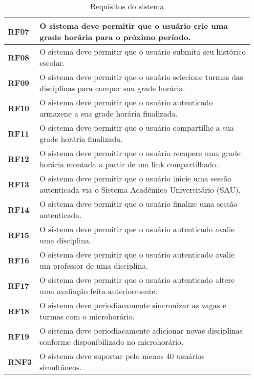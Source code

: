 \begin{table}[!ht]
    \begin{center}
        \begin{tabular}{ | m{} | p{} | }  
            \hline
            \textbf{RF07} & O sistema deve permitir que o usuário crie uma grade horária para o próximo período.\tabularnewline\hline
            \textbf{RF08} & O sistema deve permitir que o usuário submita seu histórico escolar.\tabularnewline\hline
            \textbf{RF09} & O sistema deve permitir que o usuário selecione turmas das disciplinas para compor sua grade horária.\tabularnewline\hline
            \textbf{RF10} & O sistema deve permitir que o usuário autenticado armazene a sua grade horária finalizada.\tabularnewline\hline
            \textbf{RF11} & O sistema deve permitir que o usuário compartilhe a sua grade horária finalizada. \tabularnewline\hline
            \textbf{RF12} & O sistema deve permitir que o usuário recupere uma grade horária montada a partir de um link compartilhado.\tabularnewline\hline
            
            \textbf{RF13} & O sistema deve permitir que o usuário inicie uma sessão autenticada via o Sistema Acadêmico Universitário (SAU).\tabularnewline\hline
            \textbf{RF14} & O sistema deve permitir que o usuário finalize uma sessão autenticada.\tabularnewline\hline
            \textbf{RF15} & O sistema deve permitir que o usuário autenticado avalie uma disciplina.\tabularnewline\hline
            \textbf{RF16} & O sistema deve permitir que o usuário autenticado avalie um professor de uma disciplina.\tabularnewline\hline
            \textbf{RF17} & O sistema deve permitir que o usuário autenticado altere uma avaliação feita anteriormente.\tabularnewline\hline

            \textbf{RF18} & O sistema deve periodiacamente sincronizar as vagas e turmas com o microhorário.\tabularnewline\hline
            \textbf{RF19} & O sistema deve periodiacamente adicionar novas disciplinas conforme disponibilizado no microhorário.\tabularnewline\hline

            \textbf{RNF3} & O sistema deve suportar pelo menos 40 usuários simultâneos.\tabularnewline\hline
        
        \end{tabular}
    \end{center}
    \caption{Requisitos do sistema}
    
    \label{tab:req-sistema}
\end{table}
